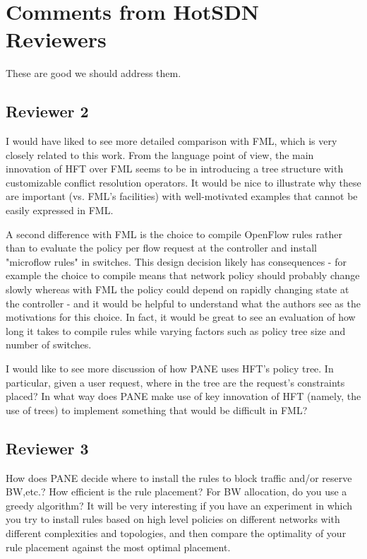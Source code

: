 \chapter{Comments from HotSDN Reviewers}

These are good we should address them.

\section{Reviewer 2}

I would have liked to see more detailed comparison with FML, which is very closely related to this work.  From the language point of view, the main innovation of HFT over FML seems to be in introducing a tree structure with customizable conflict resolution operators. It would be nice to illustrate why these are important (vs. FML's facilities) with well-motivated examples that cannot be easily expressed in FML.

A second difference with FML is the choice to compile OpenFlow rules rather than to evaluate the policy per flow request at the controller and install "microflow rules" in switches.  This design decision likely has consequences - for example the choice to compile means that network policy should probably change slowly whereas with FML the policy could depend on rapidly changing state at the controller - and it would be helpful to understand what the authors see as the motivations for this choice. In fact, it would be great to see an evaluation of how long it takes to compile rules while varying factors such as policy tree size and number of switches. 

I would like to see more discussion of how PANE uses HFT's policy tree. In particular, given a user request, where in the tree are the request's constraints placed?  In what way does PANE make use of key innovation of HFT (namely, the use of trees) to implement something that would be difficult in FML?

\section{Reviewer 3}

How does PANE decide where to install the rules to block traffic and/or reserve BW,etc.?  How efficient is the rule placement? For BW allocation, do you use a greedy algorithm? It will be very interesting if you have an experiment in which you try to install rules based on high level policies on different networks with different complexities and topologies, and then compare the optimality of your rule placement against the most optimal placement.

